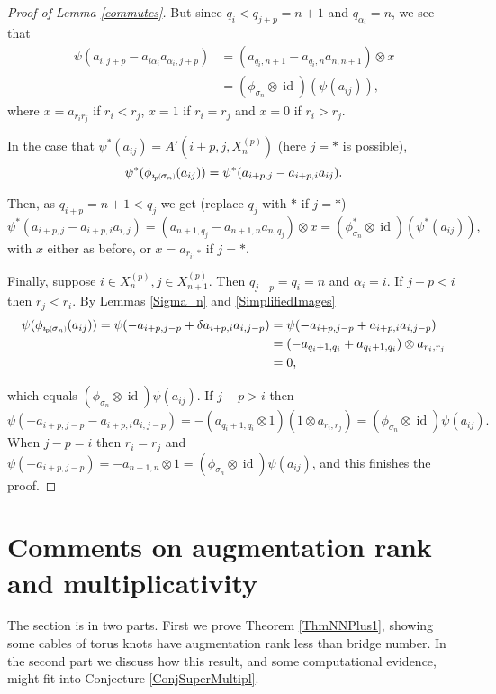 \documentclass[11pt]{amsart}
\def\s{{\sigma}}
\def\a{\alpha}
\newcommand*{\subsmallp}[1]{\scalebox{.5}{\ensuremath#1}}
\newcommand{\subpp}[2][p]{\imath_{\hspace*{-1pt}#1}\hspace*{-.5pt}\subsmallp(#2\subsmallp)}
\newcommand\id{\operatorname{id}}
\theoremstyle{definition}
\begin{document}
\begin{proof} [Proof of Lemma \ref{commutes}]
\noindent But since $q_i<q_{j+p} = n+1$ and $q_{\a_i}=n$, we see that
\begin{align*}
\psi(a_{i,j+p} - a_{i\a_i}a_{\a_i,j+p}) &= (a_{q_i,n+1} - a_{q_i,n}a_{n,n+1})\otimes x\\
&= (\phi_{\s_n} \otimes \id)(\psi(a_{ij})),
\end{align*}
\noindent where $x=a_{r_ir_j}$ if $r_i<r_j$, $x=1$ if $r_i=r_j$ and $x=0$ if $r_i>r_j$.

In the case that $\psi^\ast(a_{ij}) = A'(i+p,j,X_n^{(p)})$ (here $j=\ast$ is possible),
$$\psi^\ast(\phi_{\subpp{\s_n}}(a_{ij})) = \psi^\ast(a_{i+p,j}-a_{i+p,i}a_{ij}).$$

\noindent Then, as $q_{i+p} = n+1<q_j$ we get (replace $q_j$ with $\ast$ if $j=\ast$)
$$\psi^\ast(a_{i+p,j} - a_{i+p,i}a_{i,j}) = (a_{n+1,q_j} - a_{n+1,n}a_{n,q_j})\otimes x = (\phi^\ast_{\s_n} \otimes \id)(\psi^\ast(a_{ij})),$$
\noindent with $x$ either as before, or $x=a_{r_i,\ast}$ if $j=\ast$.

Finally, suppose $i\in X_n^{(p)},j\in X_{n+1}^{(p)}$. Then $q_{j-p}=q_i=n$ and $\a_i=i$. If $j-p<i$ then $r_j<r_i$. By Lemmas \ref{Sigma_n} and \ref{SimplifiedImages}
\begin{align*}
  \psi(\phi_{\subpp{\s_n}}(a_{ij})) = \psi(-a_{i+p,j-p}+\delta a_{i+p,i}a_{i,j-p})
            &= \psi(-a_{i+p,j-p}+a_{i+p,i}a_{i,j-p})\\
            &= (-a_{q_i+1,q_i}+a_{q_i+1,q_i})\otimes a_{r_i,r_j}\\
            &=0,
\end{align*}

\noindent which equals $(\phi_{\s_n}\otimes\id)\psi(a_{ij})$. If $j-p>i$ then 
  \[\psi(-a_{i+p,j-p}-a_{i+p,i}a_{i,j-p}) = -(a_{q_i+1,q_i}\otimes 1)(1\otimes a_{r_i,r_j}) = (\phi_{\s_n}\otimes\id)\psi(a_{ij}).\]
\noindent When $j-p=i$ then $r_i=r_j$ and $\psi(-a_{i+p,j-p}) = -a_{n+1,n}\otimes 1=(\phi_{\s_n}\otimes\id)\psi(a_{ij})$, and this finishes the proof.
\end{proof}


\section{Comments on augmentation rank and multiplicativity}
\label{SecComments}

The section is in two parts. First we prove Theorem \ref{ThmNNPlus1}, showing some cables of torus knots have augmentation rank less than bridge number. In the second part we discuss how this result, and some computational evidence, might fit into Conjecture \ref{ConjSuperMultipl}.
\end{document}
